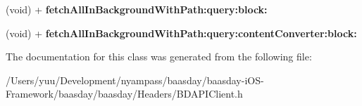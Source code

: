 \begin{DoxyCompactItemize}
\item 
\hypertarget{interface_b_d_a_p_i_client_ab92ef5ef6c39a0e227c021dce6445fb9}{(void) + {\bfseries fetch\-All\-In\-Background\-With\-Path\-:query\-:block\-:}}\label{interface_b_d_a_p_i_client_ab92ef5ef6c39a0e227c021dce6445fb9}

\item 
\hypertarget{interface_b_d_a_p_i_client_a066eb41f9899d131ea431a66b06f99e5}{(void) + {\bfseries fetch\-All\-In\-Background\-With\-Path\-:query\-:content\-Converter\-:block\-:}}\label{interface_b_d_a_p_i_client_a066eb41f9899d131ea431a66b06f99e5}

\end{DoxyCompactItemize}


The documentation for this class was generated from the following file\-:\begin{DoxyCompactItemize}
\item 
/\-Users/yuu/\-Development/nyampass/baasday/baasday-\/i\-O\-S-\/\-Framework/baasday/baasday/\-Headers/B\-D\-A\-P\-I\-Client.\-h\end{DoxyCompactItemize}
